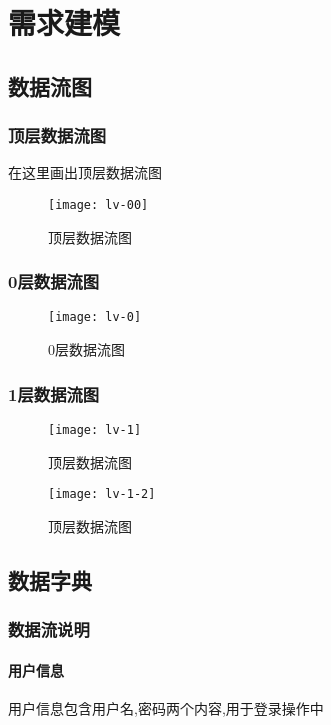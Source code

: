 \chapter{需求建模 }
\section{数据流图}
\subsection{顶层数据流图}
在这里画出顶层数据流图
\begin{figure}[ht]
	\centering
 	\texttt{[image: lv-00]}
	\caption{顶层数据流图} 
	\label{fig:figure11}
\end{figure}

\subsection{0层数据流图}
\begin{figure}[ht]
	\centering
	\texttt{[image: lv-0]}
	\caption{0层数据流图} \label{fig:figure12}
\end{figure}

\subsection{1层数据流图}
\begin{figure}[ht]
	\centering
	\texttt{[image: lv-1]}
	\caption{顶层数据流图} \label{fig:figure13}
\end{figure}

\begin{figure}[ht]
	\centering
	\texttt{[image: lv-1-2]}
	\caption{顶层数据流图} \label{fig:figure14}
\end{figure}

\section{数据字典}
\subsection{数据流说明}

\subsubsection{用户信息}

用户信息包含用户名,密码两个内容,用于登录操作中

